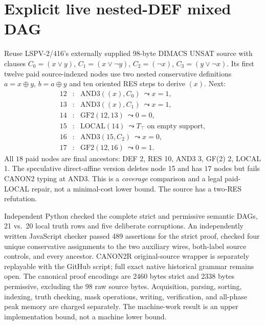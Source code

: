 \documentclass[11pt]{article}
\begin{document}
\section*{Explicit live nested-DEF mixed DAG}
Reuse LSPV-2/416's externally supplied 98-byte DIMACS UNSAT source with clauses $C_0=(x\lor y)$, $C_1=(x\lor\neg y)$, $C_2=(\neg x)$, $C_3=(y\lor\neg x)$. Its first twelve paid source-indexed nodes use two nested conservative definitions $a=x\oplus y$, $b=a\oplus y$ and ten oriented RES steps to derive $(x)$. Next:
\[
\begin{array}{rcl}
12 &:&\mathrm{AND3}((x),C_0)\ \leadsto x=1,\\
13 &:&\mathrm{AND3}((x),C_1)\ \leadsto x=1,\\
14 &:&\mathrm{GF2}(12,13)\ \leadsto 0=0,\\
15 &:&\mathrm{LOCAL}(14)\ \leadsto T_{\top}\text{ on empty support},\\
16 &:&\mathrm{AND3}(15,C_2)\ \leadsto x=0,\\
17 &:&\mathrm{GF2}(12,16)\ \leadsto 0=1.
\end{array}
\]
All $18$ paid nodes are final ancestors: DEF 2, RES 10, AND3 3, GF(2) 2, LOCAL 1. The speculative direct-affine version deletes node 15 and has $17$ nodes but fails CANON2 typing at AND3. This is a \emph{coverage} comparison and a legal paid-LOCAL repair, not a minimal-cost lower bound. The source has a two-RES refutation.

Independent Python checked the complete strict and permissive semantic DAGs, 21 vs.\ 20 local truth rows and five deliberate corruptions. An independently written JavaScript checker passed 489 assertions for the strict proof, checked four unique conservative assignments to the two auxiliary wires, both-label source controls, and every ancestor. CANON2R original-source wrapper is separately replayable with the GitHub script; full exact native historical grammar remains open. The canonical proof encodings are 2460 bytes strict and 2338 bytes permissive, excluding the 98 raw source bytes. Acquisition, parsing, sorting, indexing, truth checking, mask operations, writing, verification, and all-phase peak memory are charged separately. The machine-work result is an upper implementation bound, not a machine lower bound.
\end{document}
